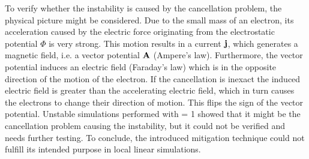 To verify whether the instability is caused by the cancellation problem, the physical picture might be considered. Due to the small mass of an electron, its acceleration caused by the electric force originating from the electrostatic potential $\Phi$ is very strong. This motion results in a current $\boldsymbol{\mathbf{j}}$, which generates a magnetic field, i.e. a vector potential $\boldsymbol{\mathbf{A}}$ (Ampere's law). Furthermore, the vector potential induces an electric field (Faraday's law) which is in the opposite direction of the motion of the electron. If the cancellation is inexact the induced electric field is greater than the accelerating electric field, which in turn causes the electrons to change their direction of motion. This flips the sign of the vector potential. Unstable simulations performed with  = 1 showed that it might be the cancellation problem causing the instability, but it could not be verified and needs further testing. To conclude, the introduced mitigation technique could not fulfill its intended purpose in local linear simulations.

\newpage